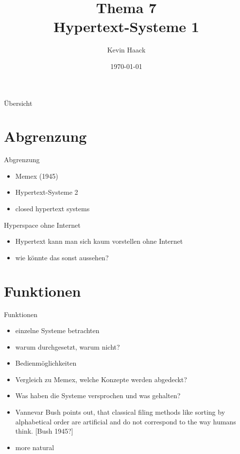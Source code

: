 \documentclass{beamer}
\title{Thema 7\\Hypertext-Systeme 1}
\author{Kevin Haack}
\institute{Universität Paderborn}
\date{\today}
\begin{document}
\begin{frame}
  \titlepage
\end{frame}

\begin{frame}{Übersicht}
\tableofcontents
\end{frame}

\section{Abgrenzung}
\begin{frame}{Abgrenzung}
	\begin{itemize}
		\item Memex (1945)
		\item Hypertext-Systeme 2
		\item closed hypertext systems
	\end{itemize}
\end{frame}

\begin{frame}{Hyperspace ohne Internet}
	\begin{itemize}
		\item Hypertext kann man sich kaum vorstellen ohne Internet
		\item wie könnte das sonst aussehen?
	\end{itemize}
\end{frame}















\section{Funktionen}
\begin{frame}{Funktionen}
\begin{itemize}
	\item einzelne Systeme betrachten
	\item warum durchgesetzt, warum nicht?
	\item Bedienmöglichkeiten
	\item Vergleich zu Memex, welche Konzepte werden abgedeckt?
	\item Was haben die Systeme versprochen und was gehalten?
	\item Vannevar Bush points out, that classical filing methods like sorting by alphabetical order are artificial and do not correspond to the way humans think. [Bush 1945?]
	\item more natural
\end{itemize}
\end{frame}
\end{document}

